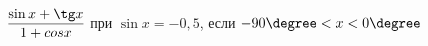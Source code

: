 \begin{ex}[type=simplify_calculate]
	\begin{condition}
		\( \dfrac{\sin x+\tg x}{1+cos x} \) при \( \sin x=-0,5 \), \quad если \( -90\degree<x<0\degree \)
	\end{condition}
\end{ex}